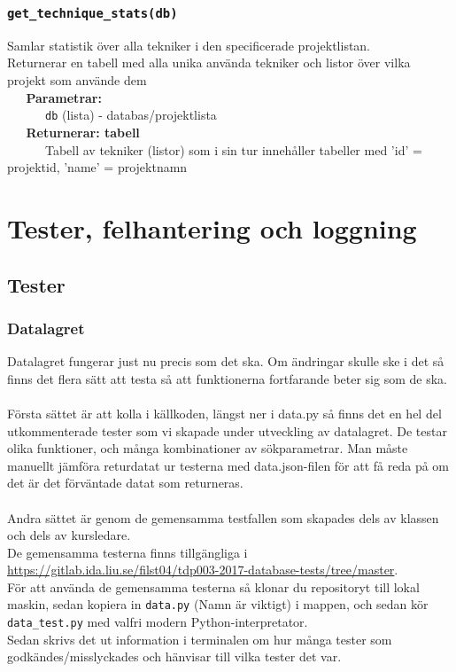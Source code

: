 \documentclass{TDP003mall}
\begin{document}
\subsubsection{\texttt{get\_technique\_stats(db)}}
Samlar statistik över alla tekniker i den specificerade projektlistan.\\
Returnerar en tabell med alla unika använda tekniker och listor över vilka projekt som använde dem\\

\verb|   |\textbf{Parametrar:}\\
\verb|   |\verb|   |\verb|db| (lista) - databas/projektlista\\

\verb|   |\textbf{Returnerar: tabell}\\
\verb|   |\verb|   |Tabell av tekniker (listor) som i sin tur innehåller tabeller med 'id' = projektid, 'name' = projektnamn

\section{Tester, felhantering och loggning}
\subsection{Tester}
\subsubsection{Datalagret}
Datalagret fungerar just nu precis som det ska. Om ändringar skulle ske i det så finns det flera sätt att testa så att funktionerna fortfarande beter sig som de ska.\\\\
Första sättet är att kolla i källkoden, längst ner i data.py så finns det en hel del utkommenterade tester som vi skapade under utveckling av datalagret. De testar olika funktioner, och många kombinationer av sökparametrar. Man måste manuellt jämföra returdatat ur testerna med data.json-filen för att få reda på om det är det förväntade datat som returneras.\\\\
Andra sättet är genom de gemensamma testfallen som skapades dels av klassen och dels av kursledare.\\
De gemensamma testerna finns tillgängliga i \url{https://gitlab.ida.liu.se/filst04/tdp003-2017-database-tests/tree/master}.\\
För att använda de gemensamma testerna så klonar du repositoryt till lokal maskin, sedan kopiera in \verb|data.py| (Namn är viktigt) i mappen, och sedan kör \verb|data_test.py| med valfri modern Python-interpretator.\\
Sedan skrivs det ut information i terminalen om hur många tester som godkändes/misslyckades och hänvisar till vilka tester det var.
\end{document}
